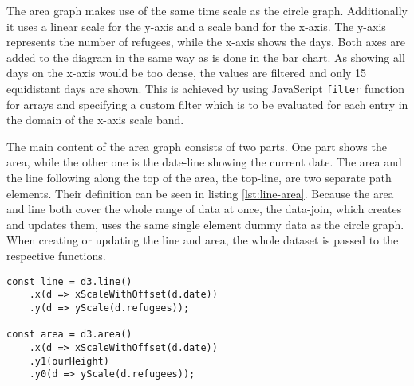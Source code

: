 The area graph makes use of the same time scale as the circle graph. Additionally it uses a linear scale for the y-axis and a scale band for the x-axis. The y-axis represents the number of refugees, while the x-axis shows the days. Both axes are added to the diagram in the same way as is done in the bar chart. As showing all days on the x-axis would be too dense, the values are filtered and only 15 equidistant days are shown. This is achieved by using JavaScript \texttt{filter} function for arrays and specifying a custom filter which is to be evaluated for each entry in the domain of the x-axis scale band.

The main content of the area graph consists of two parts. One part shows the area, while the other one is the date-line showing the current date. The area and the line following along the top of the area, the top-line, are two separate path elements. Their definition can be seen in listing \ref{lst:line-area}. Because the area and line both cover the whole range of data at once, the data-join, which creates and updates them, uses the same single element dummy data as the circle graph. When creating or updating the line and area, the whole dataset is passed to the respective functions.

\begin{minipage}{0.9\linewidth}
    \begin{lstlisting}[style=htmlCSSjs, captionpos=b, caption={The first constant defines the function for creating the top-line of the area graph. This is achieved by specifying functions for x and y values. D3 uses them to calculate the position of each point on the line. Using the arrow functions here, applies this for each entry of the data set which is passed as a parameter when calling this function. When the function is called and a data set is provided, by calling \texttt{line(data)}, the line is constructed by calculating the according x and y positions for every data-point. Defining and creating the area works in similar fashion. Yet there are two y-positions for each x-position. This allows for a huge variety of shapes. Yet it is not possible to create concave ends on the right or left side of the shape, assuming left and rigth are oriented horizontally. Of course the created shape can be rotated and oriented using all possible SVG tags and attributes. (Section from \ref{app:area-graph} lines 111ff)}, label={lst:line-area}]
const line = d3.line()
    .x(d => xScaleWithOffset(d.date))
    .y(d => yScale(d.refugees));

const area = d3.area()
    .x(d => xScaleWithOffset(d.date))
    .y1(ourHeight)
    .y0(d => yScale(d.refugees));
    \end{lstlisting}
\end{minipage}

